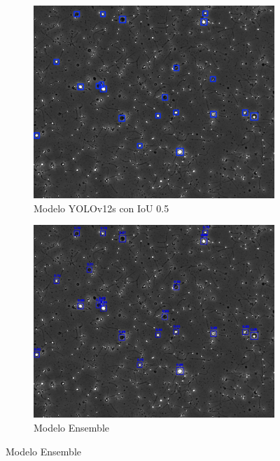 \documentclass[12pt,a4paper,onecolumn,oneside]{report}
\begin{document}
\begin{figure}[H]
  \vspace{0.3cm} 
  
  \begin{subfigure}[b]{0.48\textwidth}
    \centering
    \includegraphics[width=\textwidth]{figuras/evaluacion_cualitativa/221/221_v12.jpg}
    \caption{Modelo YOLOv12s con IoU 0.5}
    \label{fig:yolov12s_IoU0.5_image_221}
  \end{subfigure}
  \hfill
  \begin{subfigure}[b]{0.48\textwidth}
    \centering
    \includegraphics[width=\textwidth]{figuras/evaluacion_cualitativa/221/221_ensemble.jpg}
    \caption{Modelo Ensemble}
    \label{fig:ensemble_image_221}
  \end{subfigure}


\end{figure}
\end{document}
